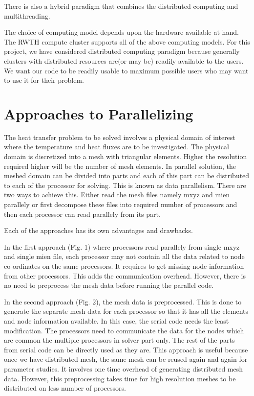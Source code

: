 \documentclass[a4paper, 11pt, oneside]{scrartcl}
\begin{document}
There is also a hybrid paradigm that combines the distributed computing and multithreading. 

The choice of computing model depends upon the hardware available at hand. The RWTH compute cluster supports all of the above computing models. For this project, we have considered distributed computing paradigm because generally clusters with distributed resources are(or may be) readily available to the users. We want our code to be readily usable to maximum possible users who may want to use it for their problem.
\section{Approaches to Parallelizing}
The heat transfer problem to be solved involves a physical domain of interest where the temperature and heat fluxes are to be investigated. The physical domain is discretized into a mesh with triangular elements. Higher the resolution required higher will be the number of mesh elements. In parallel solution, the meshed domain can be divided into parts and each of this part can be distributed to each of the processor for solving. This is known as data parallelism. There are two ways to achieve this. Either read the mesh files namely mxyz and mien parallely or first decompose these files into required number of processors and then each processor can read parallely from its part.

Each of the approaches has its own advantages and drawbacks.

In the first approach (Fig. 1) where processors read parallely from single mxyz and single mien file, each processor may not contain all the data related to node co-ordinates on the same processors. It requires to get missing node information from other processors. This adds the communication overhead. However, there is no need to preprocess the mesh data before running the parallel code. 

In the second approach (Fig. 2), the mesh data is preprocessed. This is done to generate the separate mesh data for each processor so that it has all the elements and node information available. In this case, the serial code needs the least modification. The processors need to communicate the data for the nodes which are common the multiple processors in solver part only. The rest of the parts from serial code can be directly used as they are. This approach is useful because once we have distributed mesh, the same mesh can be reused again and again for parameter studies. It involves one time overhead of generating distributed mesh data. However, this preprocessing takes time for high resolution meshes to be distributed on less number of processors. 
\end{document}
